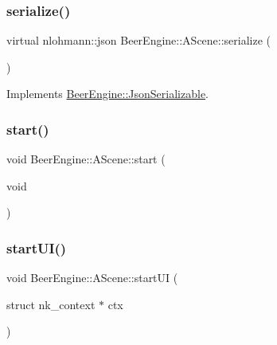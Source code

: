\mbox{\label{class_beer_engine_1_1_a_scene_ae876ec81592c80e7346f05c56bdaa929}} 
\subsubsection{\texorpdfstring{serialize()}{serialize()}}
{\footnotesize\ttfamily virtual nlohmann\+::json Beer\+Engine\+::\+A\+Scene\+::serialize (\begin{DoxyParamCaption}{ }\end{DoxyParamCaption})\hspace{0.3cm}{\ttfamily [virtual]}}



Implements \mbox{\hyperlink{class_beer_engine_1_1_json_serializable_a17689cbd8fe282c570bd026cc1be5b3b}{Beer\+Engine\+::\+Json\+Serializable}}.

\mbox{\label{class_beer_engine_1_1_a_scene_a332808581c9141259a6acdc2fa8e0e5c}} 
\subsubsection{\texorpdfstring{start()}{start()}}
{\footnotesize\ttfamily void Beer\+Engine\+::\+A\+Scene\+::start (\begin{DoxyParamCaption}\item[{void}]{ }\end{DoxyParamCaption})}

\mbox{\label{class_beer_engine_1_1_a_scene_a444a7a1321f9c8c14a2d3821f649c85e}} 
\subsubsection{\texorpdfstring{start\+U\+I()}{startUI()}}
{\footnotesize\ttfamily void Beer\+Engine\+::\+A\+Scene\+::start\+UI (\begin{DoxyParamCaption}\item[{struct nk\+\_\+context $\ast$}]{ctx }\end{DoxyParamCaption})}

